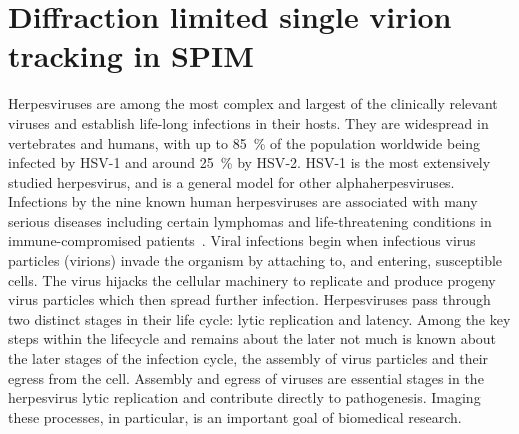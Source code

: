 \ifpdf{}
    \graphicspath{{Chapters/spt/Figs/Raster/}{Chapters/spt/Figs/PDF/}{Chapters/spt/Figs/}}
\else
    \graphicspath{{Chapters/spt/Figs/Vector/}{Chapters/spt/Figs/}}
\fi

\chapter{Diffraction limited single virion tracking in SPIM}\label{chapter:spt}


Herpesviruses are among the most complex and largest of the clinically relevant viruses and establish life-long infections in their hosts.
They are widespread in vertebrates and humans, with up to \SI{85}{\percent} of the population worldwide being infected by \gls{HSV}-1 and around \SI{25}{\percent} by \gls{HSV}-2.
\gls{HSV}-1 is the most extensively studied herpesvirus, and is a general model for other alphaherpesviruses.
Infections by the nine known human herpesviruses are associated with many serious diseases including certain lymphomas and life-threatening conditions in immune-compromised patients~\cite{meyding-lamadeHerpesvirusInfectionsCentral2012}.
Viral infections begin when infectious virus particles (\gls{virion}s) invade the organism by attaching to, and entering, susceptible cells.
The virus hijacks the cellular machinery to replicate and produce progeny virus particles which then spread further infection.
Herpesviruses pass through two distinct stages in their life cycle: lytic replication and latency.
Among the key steps within the lifecycle and remains about the later not much is known about the later stages of the infection cycle, the assembly of virus particles and their egress from the cell.
Assembly and egress of viruses are essential stages in the herpesvirus lytic replication and contribute directly to pathogenesis.
Imaging these processes, in particular, is an important goal of biomedical research.

